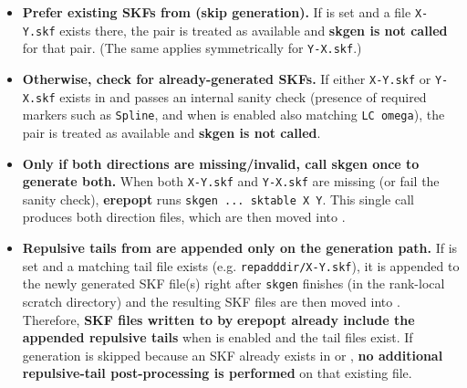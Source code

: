 \begin{itemize}
\item \textbf{Prefer existing SKFs from  (skip generation).}
If  is set and a file \texttt{X-Y.skf} exists there, the pair is treated as available and
\textbf{skgen is not called} for that pair. (The same applies symmetrically for \texttt{Y-X.skf}.)
\item \textbf{Otherwise, check  for already-generated SKFs.}
If either \texttt{X-Y.skf} or \texttt{Y-X.skf} exists in  and passes an internal sanity check
(presence of required markers such as \texttt{Spline}, and when  is enabled also matching \texttt{LC omega}),
the pair is treated as available and \textbf{skgen is not called}.
\item \textbf{Only if both directions are missing/invalid, call skgen once to generate both.}
When both \texttt{X-Y.skf} and \texttt{Y-X.skf} are missing (or fail the sanity check), \textbf{erepopt} runs
\texttt{skgen ... sktable X Y}. This single call produces both direction files, which are then moved into .
\item \textbf{Repulsive tails from  are appended only on the generation path.}
If  is set and a matching tail file exists (e.g. \texttt{repadddir/X-Y.skf}), it is appended
to the newly generated SKF file(s) right after \texttt{skgen} finishes (in the rank-local scratch directory) and
the resulting SKF files are then moved into . Therefore, \textbf{SKF files written to  by}
\textbf{erepopt already include the appended repulsive tails} when  is enabled and the tail files exist.
If generation is skipped because an SKF
already exists in  or , \textbf{no additional repulsive-tail post-processing is performed}
on that existing file.
\end{itemize}

